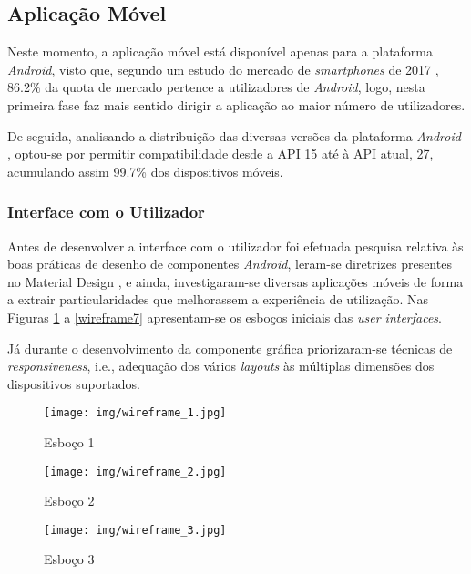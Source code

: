 \subsection{Aplicação Móvel}

Neste momento, a aplicação móvel está disponível apenas para a plataforma \textit{Android}, visto que, segundo um estudo do mercado de \textit{smartphones} de 2017 \cite{AppleVsAndroid:comparative}, 86.2\% da quota de mercado pertence a utilizadores de \textit{Android}, logo, nesta primeira fase faz mais sentido dirigir a aplicação ao maior número de utilizadores.

De seguida, analisando a distribuição das diversas versões da plataforma \textit{Android} \cite{Distribution:android}, optou-se por permitir compatibilidade desde a API 15 até à API atual, 27, acumulando assim 99.7\% dos dispositivos móveis.
 
 
\subsubsection{Interface com o Utilizador}

Antes de desenvolver a interface com o utilizador foi efetuada pesquisa relativa às boas práticas de desenho de componentes \textit{Android}, leram-se diretrizes presentes no Material Design \cite{MaterialDesign:homepage}, e ainda, investigaram-se diversas aplicações móveis de forma a extrair particularidades que melhorassem a experiência de utilização. Nas Figuras \ref{wireframe1} a \ref{wireframe7} apresentam-se os esboços iniciais das \textit{user interfaces}.

Já durante o desenvolvimento da componente gráfica priorizaram-se técnicas de \textit{responsiveness}, i.e., adequação dos vários \textit{layouts} às múltiplas dimensões dos dispositivos suportados.


\begin{figure}[H]
	\centering
	\texttt{[image: img/wireframe\_1.jpg]}
	\caption{Esboço 1}
	\label{wireframe1}
\end{figure}

\begin{figure}[H]
	\centering
	\texttt{[image: img/wireframe\_2.jpg]}
	\caption{Esboço 2}
	\label{wireframe2}
\end{figure}

\begin{figure}[H]
	\centering
	\texttt{[image: img/wireframe\_3.jpg]}
	\caption{Esboço 3}
	\label{wireframe3}
\end{figure}

